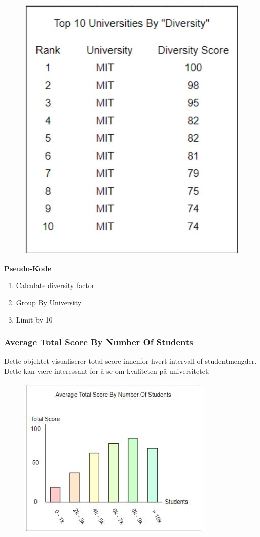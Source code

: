 \FigureCounter
\begin{figure}[H]
  \includegraphics[scale=1]{images/milepael4/topTenUnis.JPG}
\end{figure}

\textbf{Pseudo-Kode}
\begin{enumerate}
  \item Calculate diversity factor
  \item Group By University
  \item Limit by 10
\end{enumerate}
\pagebreak
\subsubsection{Average Total Score By Number Of Students}
Dette objektet visualiserer total score innenfor hvert intervall of studentmengder. Dette kan være 
interessant for å se om kvaliteten på universitetet.

\FigureCounter
\begin{figure}[H]
  \includegraphics[scale=1]{images/milepael4/averageScoreByStudents.JPG}
\end{figure}

